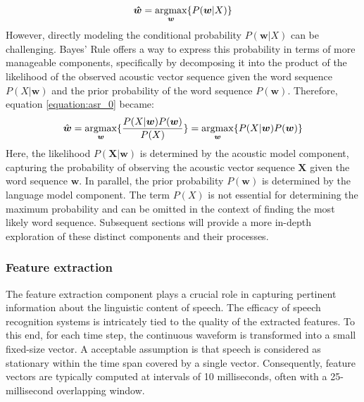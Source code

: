 \begin{equation} \label{equation:asr_0}
    \boldsymbol{\hat{w}} = \operatorname*{argmax}_{\boldsymbol{w}} \{P(\boldsymbol{w}|X)\}
\end{equation}
However, directly modeling the conditional probability $P(\boldsymbol{w}|X)$ can be challenging. Bayes' Rule offers a way to express this probability in terms of more manageable components, specifically by decomposing it into the product of the likelihood of the observed acoustic vector sequence given the word sequence $P(X|\boldsymbol{w})$ and the prior probability of the word sequence $P(\boldsymbol{w})$. Therefore, equation \ref{equation:asr_0} became:
\begin{equation}  \label{equation:asr}
    \hat{\boldsymbol{w}} = \operatorname*{argmax}_{\boldsymbol{w}} \{\frac{P(X|\boldsymbol{w})P(\boldsymbol{w})}{P(X)}\} =\operatorname*{argmax}_{\boldsymbol{w}} \{P(X|\boldsymbol{w})P(\boldsymbol{w})\}
\end{equation}
Here,  the likelihood $P(\boldsymbol{X}|\boldsymbol{w})$ is determined by the acoustic model component, capturing the probability of observing the acoustic vector sequence $\boldsymbol{X}$ given the word sequence $\boldsymbol{w}$. In parallel,  the prior probability $P(\boldsymbol{w})$ is determined by the language model component. The term $P(X)$ is not essential for determining the maximum probability and can be omitted in the context of finding the most likely word sequence. Subsequent sections will provide a more in-depth exploration of these distinct components and their processes.


\subsubsection{Feature extraction}%
\label{subsection:features}

The feature extraction component plays a crucial role in capturing pertinent information about the linguistic content of speech. The efficacy of speech recognition systems is intricately tied to the quality of the extracted features. To this end, for each time step, the continuous waveform is transformed into a small fixed-size vector. A acceptable assumption is that speech is considered as stationary within the time span covered by a single vector. Consequently, feature vectors are typically computed at intervals of 10 milliseconds, often with a 25-millisecond overlapping window.

